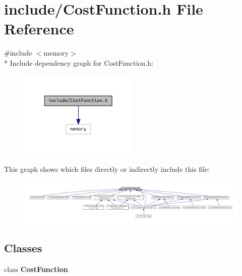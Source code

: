 \section{include/\+Cost\+Function.h File Reference}
\label{_cost_function_8h}
{\ttfamily \#include $<$memory$>$}\\*
Include dependency graph for Cost\+Function.\+h\+:
\nopagebreak
\begin{figure}[H]
\begin{center}
\leavevmode
\includegraphics[width=161pt]{_cost_function_8h__incl}
\end{center}
\end{figure}
This graph shows which files directly or indirectly include this file\+:
\nopagebreak
\begin{figure}[H]
\begin{center}
\leavevmode
\includegraphics[width=350pt]{_cost_function_8h__dep__incl}
\end{center}
\end{figure}
\subsection*{Classes}
\begin{DoxyCompactItemize}
\item 
class {\bf Cost\+Function}
\end{DoxyCompactItemize}
